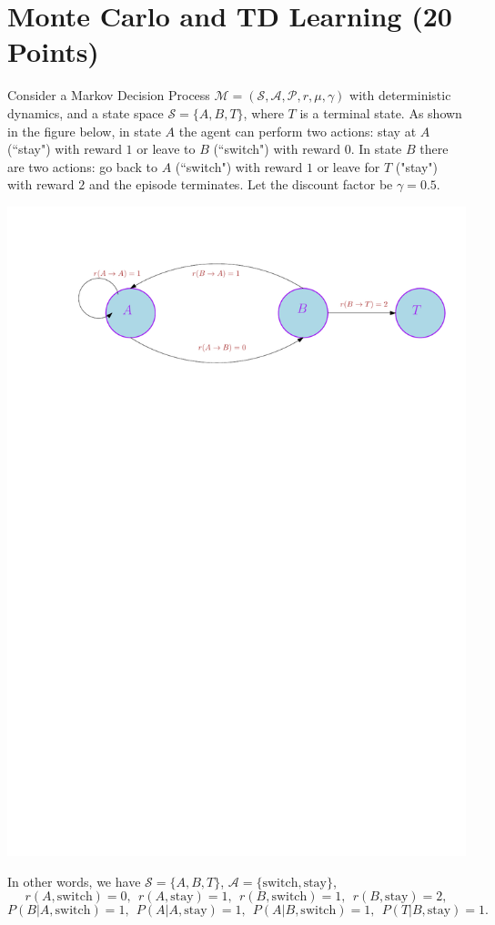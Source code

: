 \newpage

\section{Monte Carlo and TD Learning (20 Points)}

Consider a Markov Decision Process $\mathcal{M} = (\mathcal{S}, \mathcal{A},\mathcal{P}, r, \mu, \gamma)$ with deterministic dynamics, and a state space $\mathcal{S}=\{A, B, T\}$, where $T$ is a terminal state. As shown in the figure below, in state $A$ the agent can perform two actions: stay at $A$ (``stay") with reward $1$ or leave to $B$ (``switch") with reward $0$. In state $B$ there are two actions: go back to $A$ (``switch") with reward $1$ or leave for $T$ ("stay") with reward $2$ and the episode terminates. Let the discount factor be  $\gamma = 0.5$. 
  
\begin{center}
    \includegraphics[width=0.6\linewidth]{figs/mdp_3state.pdf}
\end{center}
\vspace{8pt}


In other words, we have $\mathcal{S}=\{A,B,T\}$, $\mathcal{A}=\{\text{switch}, \text{stay}\}$,
$$
r(A,\text{switch})=0,\ \ r(A,\text{stay})=1,\ \ r(B,\text{switch})=1,\ \ r(B,\text{stay})=2,
$$
$$
P(B|A,\text{switch})=1,\ \ P(A|A,\text{stay})=1,\ \  P(A|B,\text{switch})=1,\ \ P(T|B,\text{stay})=1.
$$

